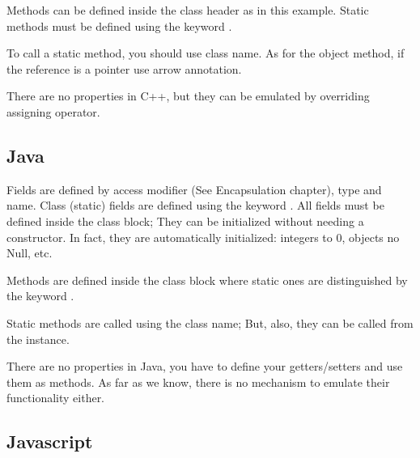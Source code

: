 \documentclass{KodeBook}
\begin{document}
 

Methods can be defined inside the class header as in this example.
Static methods must be defined using the keyword . 



To call a static method, you should use class name. 
As for the object method, if the reference is a pointer use arrow annotation.



There are no properties in C++, but they can be emulated by overriding assigning operator.

\subsection{Java}

Fields are defined by access modifier (See Encapsulation chapter), type and name. 
Class (static) fields are defined using the keyword .
All fields must be defined inside the class block; They can be initialized without needing a constructor. 
In fact, they are automatically initialized: integers to 0, objects no Null, etc. 



Methods are defined inside the class block where static ones are distinguished by the keyword .



Static methods are called using the class name; But, also, they can be called from the instance. 



There are no properties in Java, you have to define your getters/setters and use them as methods. 
As far as we know, there is no mechanism to emulate their functionality either.


\subsection{Javascript}
\end{document}
